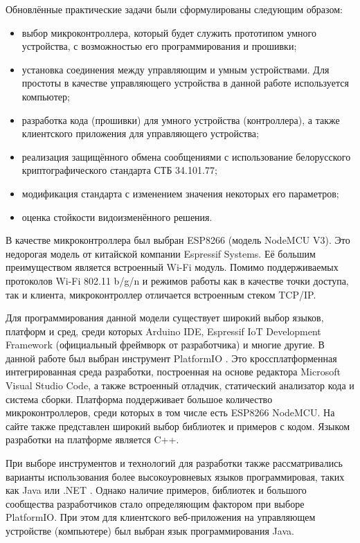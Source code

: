 	Обновлённые практические задачи были сформулированы следующим образом:
	
	\begin{itemize}
		\item выбор микроконтроллера, который будет служить прототипом умного устройства,
		с возможностью его программирования и прошивки;
		\item установка соединения между управляющим и умным устройствами. Для простоты в качестве
		управляющего устройства в данной работе используется компьютер;
		\item разработка кода (прошивки) для умного устройства (контроллера), а также клиентского
		приложения для управляющего устройства;
		\item реализация защищённого обмена сообщениями с использование белорусского криптографического
		стандарта СТБ 34.101.77;
		\item модификация стандарта с изменением значения некоторых его параметров;
		\item оценка стойкости видоизменённого решения.
	\end{itemize}

	В качестве микроконтроллера был выбран ESP8266 (модель NodeMCU V3). Это недорогая модель от
	китайской компании Espressif Systems. Её большим преимуществом является встроенный Wi-Fi модуль. 
	Помимо поддерживаемых протоколов Wi-Fi 802.11 b/g/n и режимов работы как в качестве точки доступа,
	так и клиента, микроконтроллер отличается встроенным стеком TCP/IP.
	
	Для программирования данной модели существует широкий выбор языков, платформ и сред, среди
	которых Arduino IDE, Espressif IoT Development Framework (официальный фреймворк от разработчика)
	и многие другие. В данной работе был выбран инструмент PlatformIO \cite{platformio}. Это
	кроссплатформенная интегрированная среда разработки, построенная на основе редактора Microsoft 
	Visual Studio Code, а также встроенный отладчик, статический анализатор кода и система сборки.
	Платформа поддерживает большое количество микроконтроллеров, среди которых в том числе есть
	ESP8266 NodeMCU. На сайте также представлен широкий выбор библиотек и примеров с кодом.
	Языком разработки на платформе является C++.
	
	При выборе инструментов и технологий для разработки также рассматривались варианты использования
	более высокоуровневых языков программировая, таких как Java \cite{microej} или .NET \cite{nanoFramework}.
	Однако наличие примеров, библиотек и большого сообщества разработчиков стало определяющим
	фактором при выборе PlatformIO. При этом для клиентского веб-приложения на управляющем устройстве
	(компьютере) был выбран язык программирования Java.
	
